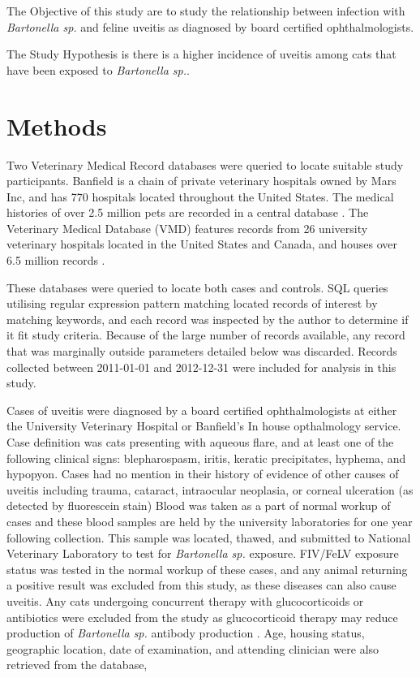 \documentclass[11pt,twocolumn]{article}
\begin{document}
		\newpage

			The Objective of this study are to study the relationship between infection with \emph{Bartonella sp.} and feline uveitis as diagnosed by board certified ophthalmologists.


			The Study Hypothesis is there is a higher incidence of uveitis among cats that have been exposed to \emph{Bartonella sp.}.
\section{Methods}
	Two Veterinary Medical Record databases were queried to locate suitable study participants.
	Banfield is a chain of private veterinary hospitals owned by Mars Inc, and has 770 hospitals located throughout the United States.
	The medical histories of over 2.5 million pets are recorded in a central database \cite{bark12}.
	The Veterinary Medical Database (VMD) features records from 26 university veterinary hospitals located in the United States and Canada, and houses over 6.5 million records \cite{UniversityVeterinary}.
	

	These databases were queried to locate both cases and controls. SQL queries utilising regular expression pattern matching located records of interest by matching keywords, and each record was inspected by the author to determine if it fit study criteria. Because of the large number of records available, any record that was marginally outside parameters detailed below was discarded.
	Records collected between 2011-01-01 and 2012-12-31 were included for analysis in this study.


	Cases of uveitis were diagnosed by a board certified ophthalmologists at either the University Veterinary Hospital or Banfield's In house opthalmology service.
	Case definition was cats presenting with aqueous flare, and at least one of the following clinical signs: blepharospasm, iritis, keratic precipitates, hyphema, and hypopyon. 
	Cases had no mention in their history of evidence of other causes of uveitis including trauma, cataract, intraocular neoplasia, or corneal ulceration (as detected by fluorescein stain) 
	Blood was taken as a part of normal workup of cases and these blood samples are held by the university laboratories for one year following collection. This sample was located, thawed, and submitted to National Veterinary Laboratory to test for \emph{Bartonella sp.} exposure.
	FIV/FeLV exposure status was tested in the normal workup of these cases, and any animal returning a positive result was excluded from this study, as these diseases can also cause uveitis. 
	Any cats undergoing concurrent therapy with glucocorticoids or antibiotics were excluded from the study as glucocorticoid therapy may reduce production of \emph{Bartonella sp.} antibody production \cite{Lappin2000}.
	Age, housing status, geographic location, date of examination, and attending clinician  were also retrieved from the database, 
\end{document}
